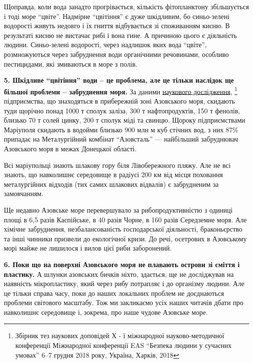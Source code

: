Щоправда, коли вода занадто прогрівається, кількість фітопланктону збільшується
і тоді море \enquote{цвіте}. Надмірне \enquote{цвітіння} є дуже шкідливим, бо синьо-зелені
водорості живуть недовго і їх гниття відбувається зі споживанням кисню. В
результаті кисню не вистачає рибі і вона гине. А причиною цього є діяльність
людини. Синьо-зелені водорості, через надлишок яких вода \enquote{цвіте}, розмножуються
через забруднення води органічними речовинами, особливо пестицидами, які
змиваються в море з полів.


\textbf{5. Шкідливе \enquote{цвітіння} води – це проблема, але це тільки
наслідок ще більшої проблеми – забруднення моря.} За даними
\href{http://web.kpi.kharkov.ua/safetyofliving/wp-content/uploads/sites/171/2018/12/eas-2018.pdf}{наукового
дослідження},
\footnote{%
Збірник тез наукових доповідей Х - ї міжнародної науково-методичної конференції %
Міжнародної конференції EAS \enquote{Безпека людини у сучасних умовах} 6–7 грудня 2018 року, %
Україна, Харків, 2018%
} підприємства, що знаходяться в прибережній зоні Азовського моря,
скидають туди щорічно понад 1000 т сполук заліза, 300 т нафтопродуктів, 150 т
фенолів, близько 70 т солей цинку, 200 т сполук міді та свинцю. Щороку
підприємствами Маріуполя скидають в водойми близько 900 млн м куб стічних вод,
з них 87\% припадає на Металургійний комбінат \enquote{Азовсталь} — найбільший
забруднювач Азовського моря в межах Донецької області.


Всі маріупольці знають шлакову гору біля Лівобережного пляжу. Але не всі
знають, що навколишнє середовище в радіусі 200 км від місця поховання
металургійних відходів (тих самих шлакових відвалів) є забрудненим за
замовчанням.

Ще недавно Азовське море перевершувало за рибопродуктивністю з одиниці
площі в 6,5 разів Каспійське, в 40 разів Чорне, в 160 разів Середземне моря.
Але хімічне забруднення, незбалансованість господарської діяльності,
браконьєрство та інші чинники призвели до екологічної кризи. До речі, осетрових
в Азовському морі майже не лишилося і вилов цієї риби заборонений.


\textbf{6. Поки що на поверхні Азовського моря не плавають острови зі сміття і
пластику.} А шлунки азовських бичків ніхто, здається, ще не досліджував на
наявність мікропластику, який через рибу потрапляє і до організму людини. Але
це тільки справа часу, поки до наших локальних проблем не доєднаються проблеми
світового масштабу. Тож ми закликаємо усіх наших читачів дбати про навколишнє
середовище і, зокрема, про наше чудове Азовське море.

